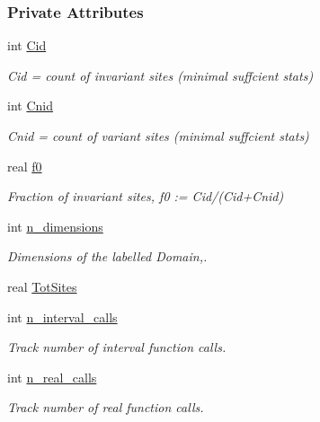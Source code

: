\subsubsection*{\-Private \-Attributes}
\begin{DoxyCompactItemize}
\item 
int \hyperlink{classFCFN3Star_a75abf79fc92c2683219829ce86a43a77}{\-Cid}
\begin{DoxyCompactList}\small\item\em \-Cid = count of invariant sites (minimal suffcient stats) \end{DoxyCompactList}\item 
int \hyperlink{classFCFN3Star_ace3c43e5c025a8cd9976ce78202fa542}{\-Cnid}
\begin{DoxyCompactList}\small\item\em \-Cnid = count of variant sites (minimal suffcient stats) \end{DoxyCompactList}\item 
real \hyperlink{classFCFN3Star_a3afd13820d74fa145d6beafe2855e333}{f0}
\begin{DoxyCompactList}\small\item\em \-Fraction of invariant sites, f0 \-:= \-Cid/(\-Cid+\-Cnid) \end{DoxyCompactList}\item 
int \hyperlink{classFCFN3Star_a47a41d53ca005cab246ef1954e8e34e0}{n\-\_\-dimensions}
\begin{DoxyCompactList}\small\item\em \-Dimensions of the labelled \-Domain,. \end{DoxyCompactList}\item 
real \hyperlink{classFCFN3Star_a1d596a2072a382eb4e11d99bca03b81d}{\-Tot\-Sites}
\item 
int \hyperlink{classFCFN3Star_acdf33272ab3d95cd51709cd39a846ddd}{n\-\_\-interval\-\_\-calls}
\begin{DoxyCompactList}\small\item\em \-Track number of interval function calls. \end{DoxyCompactList}\item 
int \hyperlink{classFCFN3Star_a1f84d41d7101ffe0d1485f414065d09e}{n\-\_\-real\-\_\-calls}
\begin{DoxyCompactList}\small\item\em \-Track number of real function calls. \end{DoxyCompactList}\end{DoxyCompactItemize}



